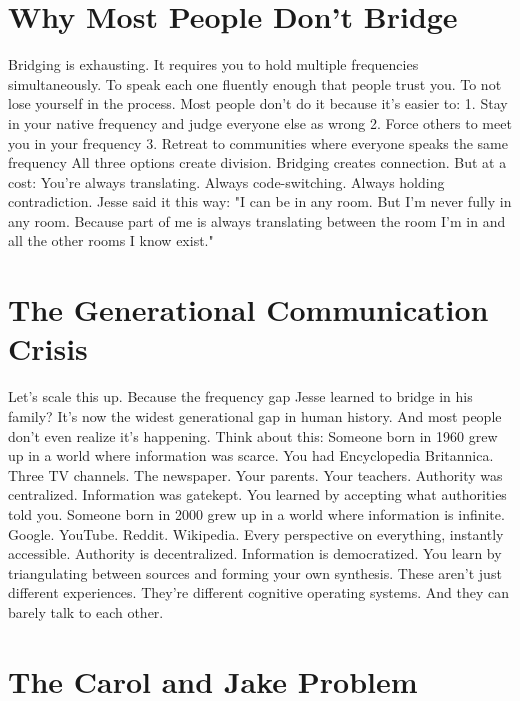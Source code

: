 \documentclass[12pt,openany]{book}
\begin{document}
\section{Why Most People Don't Bridge}

Bridging is exhausting.
It requires you to hold multiple frequencies simultaneously. To speak each one fluently enough that people trust you. To not lose yourself in the process.
Most people don't do it because it's easier to:
1. Stay in your native frequency and judge everyone else as wrong
2. Force others to meet you in your frequency
3. Retreat to communities where everyone speaks the same frequency
All three options create division.
Bridging creates connection. But at a cost: You're always translating. Always code-switching. Always holding contradiction.
Jesse said it this way: "I can be in any room. But I'm never fully in any room. Because part of me is always translating between the room I'm in and all the other rooms I know exist."

\section{The Generational Communication Crisis}

Let's scale this up.
Because the frequency gap Jesse learned to bridge in his family? It's now the widest generational gap in human history.
And most people don't even realize it's happening.
Think about this:
Someone born in 1960 grew up in a world where information was scarce. You had Encyclopedia Britannica. Three TV channels. The newspaper. Your parents. Your teachers.
Authority was centralized. Information was gatekept. You learned by accepting what authorities told you.
Someone born in 2000 grew up in a world where information is infinite. Google. YouTube. Reddit. Wikipedia. Every perspective on everything, instantly accessible.
Authority is decentralized. Information is democratized. You learn by triangulating between sources and forming your own synthesis.
These aren't just different experiences. They're different cognitive operating systems.
And they can barely talk to each other.

\section{The Carol and Jake Problem}
\end{document}
